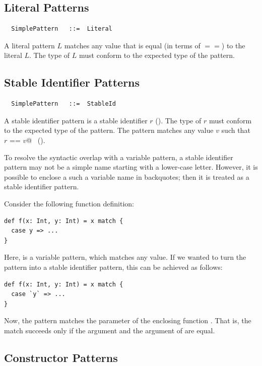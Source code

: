 \subsection{Literal Patterns}

\syntax\begin{lstlisting}
  SimplePattern   ::=  Literal
\end{lstlisting}

A literal pattern $L$ matches any value that is equal (in terms of
$==$) to the literal $L$. The type of $L$ must conform to the
expected type of the pattern.

\subsection{Stable Identifier Patterns} 

\syntax
\begin{lstlisting}
  SimplePattern   ::=  StableId
\end{lstlisting}

A stable identifier pattern is a stable identifier $r$
(). The type of $r$ must conform to the expected
type of the pattern. The pattern matches any value $v$ such that
~\lstinline@$r$ == $v$@~ ().

To resolve the syntactic overlap with a variable pattern, a
stable identifier pattern may not be a simple name starting with a lower-case
letter. However, it is possible to enclose a such a variable name in
backquotes; then it is treated as a stable identifier pattern.

\example Consider the following function definition:
\begin{lstlisting}
def f(x: Int, y: Int) = x match {
  case y => ...
}
\end{lstlisting}
Here, \lstinline@y@ is a variable pattern, which matches any value.
If we wanted to turn the pattern into a stable identifier pattern, this
can be achieved as follows:
\begin{lstlisting}
def f(x: Int, y: Int) = x match {
  case `y` => ...
}
\end{lstlisting}
Now, the pattern matches the  parameter of the enclosing function .
That is, the match succeeds only if the  argument and the 
argument of  are equal.

\subsection{Constructor Patterns}

